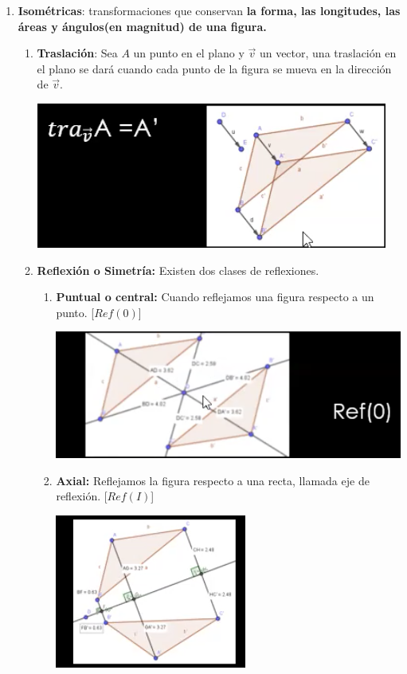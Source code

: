 \begin{enumerate}
	\item \textbf{Isométricas}: transformaciones que conservan \textbf{la forma, las longitudes, las áreas y ángulos(en magnitud) de una figura.}
	\begin{enumerate}
		\item \textbf{Traslación}: Sea $A$ un punto en el plano y $\vec{v}$ un vector, una traslación en el plano se dará cuando cada punto de la figura se mueva en la dirección de $\vec{v}$.
		 \begin{center}
			\includegraphics[scale=0.5]{images/Sesion1/1}
		\end{center} 
	\item \textbf{Reflexión o Simetría:} Existen dos clases de reflexiones. 
	\begin{enumerate}
		\item \textbf{Puntual o central:} Cuando reflejamos una figura respecto a un punto. [$Ref(0)$]  \begin{center}
				\includegraphics[scale=0.5]{images/Sesion1/2.png}
		\end{center}
		\item \textbf{Axial:} Reflejamos la figura respecto a una recta, llamada eje de reflexión. [$Ref(I)$]  \begin{center}
		\includegraphics[scale=0.5]{images/Sesion1/3.png}

\end{center}
\end{enumerate}
\end{enumerate}
\end{enumerate}
